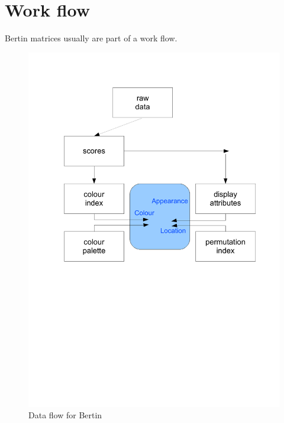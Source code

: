 \documentclass[nogin, dvips,12pt,a4paper,twoside]{amsart}
\begin{document}
\section{Work flow}

Bertin matrices usually are part of a work flow.

\begin{figure}[htbp]
\begin{center}
\includegraphics{workflow}
\caption{Data flow for Bertin}
\label{fig:workflow}
\end{center}
\end{figure}
\end{document}
